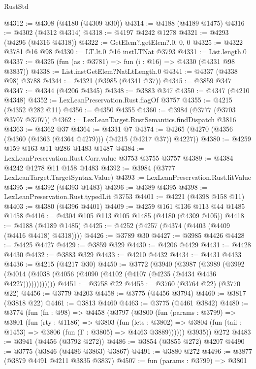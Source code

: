 \begin{lexlean}{RustStd}
\begin{coremodule}
@4312 := @4308 (@4180 (@4309 @30))
@4314 := @4188 (@4189 @1475)
@4316 := @4302 (@4312 @4314)
@4318 := @4197 @4242 @1278
@4321 := @4293 (@4296 (@4316 @4318))
@4322 := GetElem?.getElem?.{0, 0, 0}
@4325 := @4322 @3781 @16 @98
@4330 := LT.lt.{0} @16 instLTNat @3793
@4331 := List.length.{0}
@4337 := @4325 (fun (as : @3781) => fun (i : @16) => @4330 (@4331 @98 @3837))
@4338 := List.instGetElem?NatLtLength.{0}
@4341 := @4337 (@4338 @98) @3788
@4344 := @4321 (@3985 (@4341 @37))
@4345 := @3859 @347
@4347 := @4344 (@4206 @4345)
@4348 := @3883 @347
@4350 := @4347 (@4210 @4348)
@4352 := LexLeanPreservation.Rust.flagOf @3757
@4355 := @4215 (@4352 @282 @11)
@4356 := @4350 @4355
@4360 := @3984 (@3777 (@3703 @3707 @3707))
@4362 := LexLeanTarget.RustSemantics.findDispatch @3816
@4363 := @4362 @37
@4364 := @4331 @7
@4374 := @4265 (@4270 (@4356 (@4360 (@4363 (@4364 @4279))) (@4215 (@4217 @37)) @4227))
@4380 := @4259 @159 @163 @11 @286 @1483 @1487
@4384 := LexLeanPreservation.Rust.Corr.value @3753 @3755 @3757
@4389 := @4384 @4242 @1278 @11 @158 @1483
@4392 := @3984 (@3777 LexLeanTarget.TargetSyntax.Value)
@4393 := LexLeanPreservation.Rust.litValue
@4395 := @4392 (@4393 @1483)
@4396 := @4389 @4395
@4398 := LexLeanPreservation.Rust.typedLit @3753
@4401 := @4221 (@4398 @158 @11)
@4403 := @4380 (@4396 @4401)
@4409 := @4259 @161 @136 @113 @44 @1485 @1458
@4416 := @4304 @105 @113 @105 @1485 (@4180 (@4309 @105))
@4418 := @4188 (@4189 @1485)
@4425 := @4252 (@4257 (@4374 (@4403 (@4409 (@4416 @4418) @4318))))
@4426 := @3789 @30
@4427 := @3985 @4426
@4428 := @4425 @4427
@4429 := @3859 @329
@4430 := @4206 @4429
@4431 := @4428 @4430
@4432 := @3883 @329
@4433 := @4210 @4432
@4434 := @4431 @4433
@4436 := @4215 (@4217 @30)
@4450 := @3772
    (@3940
      (@3987
        (@3989
          (@3992 (@4014 (@4038 (@4056 (@4090 (@4102 (@4107 (@4235 (@4434 @4436 @4227))))))))))))
@4451 := @3758 @22
@4455 := @3760 (@3764 @22) (@3770 @22)
@4456 := @3779 @4203
@4458 := @3775 (@4456 @3794)
@4460 := @3817 (@3818 @22)
@4461 := @3813 @4460
@4463 := @3775 (@4461 @3842)
@4480 := @3774
    (fun (fn : @98) =>
    @4458
      (@3797
        (@3800
          (fun (params : @3799) =>
          @3801
            (fun (rty : @1186) =>
            @3803
              (fun (lets : @3802) =>
              @3804 (fun (tail : @1453) => @3806 (fun (Γ : @3805) => @4463 @3889))))))
        @3935))
    @272
@4483 := @3941 (@4456 (@3792 @272))
@4486 := @3854 (@3855 @272) @4207
@4490 := @3775 (@3846 (@4486 @3863) @3867)
@4491 := @3880 @272
@4496 := @3877 (@3879 @4491 @4211 @3835 @3837)
@4507 := fun (params : @3799) =>
  @3801

\end{coremodule}
\end{lexlean}
